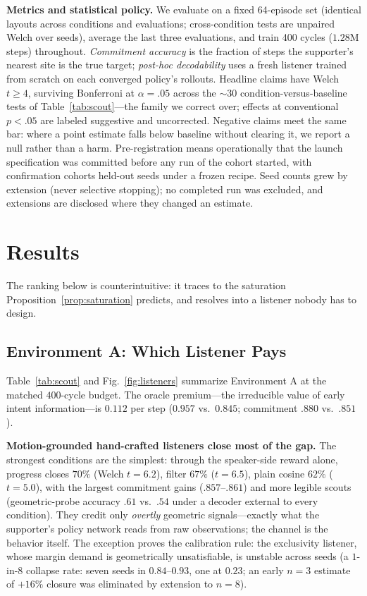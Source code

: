 \documentclass[sigconf,review,anonymous]{acmart}
\begin{document}
\textbf{Metrics and statistical policy.} We evaluate on a fixed 64-episode set (identical layouts across conditions and evaluations; cross-condition tests are unpaired Welch over seeds), average the last three evaluations, and train 400 cycles ($1.28$M steps) throughout. \emph{Commitment accuracy} is the fraction of steps the supporter's nearest site is the true target; \emph{post-hoc decodability} uses a fresh listener trained from scratch on each converged policy's rollouts. Headline claims have Welch $t \geq 4$, surviving Bonferroni at $\alpha{=}.05$ across the ${\sim}30$ condition-versus-baseline tests of Table~\ref{tab:scout}---the family we correct over; effects at conventional $p{<}.05$ are labeled suggestive and uncorrected. Negative claims meet the same bar: where a point estimate falls below baseline without clearing it, we report a null rather than a harm. Pre-registration means operationally that the launch specification was committed before any run of the cohort started, with confirmation cohorts held-out seeds under a frozen recipe. Seed counts grew by extension (never selective stopping); no completed run was excluded, and extensions are disclosed where they changed an estimate.

\section{Results}
\label{sec:results}

The ranking below is counterintuitive: it traces to the saturation Proposition~\ref{prop:saturation} predicts, and resolves into a listener nobody has to design.

\subsection{Environment A: Which Listener Pays}
\label{ssec:results_scout}

Table~\ref{tab:scout} and Fig.~\ref{fig:listeners} summarize Environment A at the matched $400$-cycle budget. The oracle premium---the irreducible value of early intent information---is $0.112$ per step ($0.957$ vs.\ $0.845$; commitment $.880$ vs.\ $.851$).

\textbf{Motion-grounded hand-crafted listeners close most of the gap.} The strongest conditions are the simplest: through the speaker-side reward alone, progress closes $70\%$ (Welch $t=6.2$), filter $67\%$ ($t=6.5$), plain cosine $62\%$ ($t=5.0$), with the largest commitment gains ($.857$--$.861$) and more legible scouts (geometric-probe accuracy $.61$ vs.\ $.54$ under a decoder external to every condition). They credit only \emph{overtly} geometric signals---exactly what the supporter's policy network reads from raw observations; the channel is the behavior itself. The exception proves the calibration rule: the exclusivity listener, whose margin demand is geometrically unsatisfiable, is unstable across seeds (a $1$-in-$8$ collapse rate: seven seeds in $0.84$--$0.93$, one at $0.23$; an early $n{=}3$ estimate of $+16\%$ closure was eliminated by extension to $n{=}8$).
\end{document}
